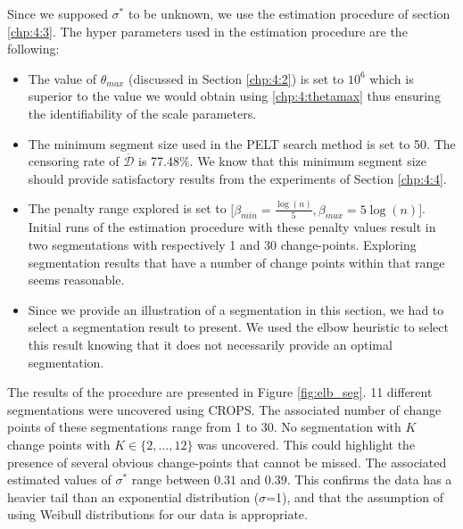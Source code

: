 Since we supposed $\sigma^*$ to be unknown, we use the estimation procedure of section \ref{chp:4:3}. The hyper parameters used in the estimation procedure are the following: 
\begin{itemize}
\item The value of $\theta_{max}$ (discussed in Section \ref{chp:4:2}) is set to $10^6$ which is superior to the value we would obtain using \eqref{chp:4:thetamax} thus ensuring the identifiability of the scale  parameters. 
\item The minimum segment size used in the PELT search method is set to 50. The censoring rate of $\overline{\mathcal{D}}$ is 77.48\%. We know that this minimum segment size should provide satisfactory results from the experiments of Section \ref{chp:4:4}.
\item The penalty range explored is set to $\bigg[\beta_{min} = \frac{\log(n)}{5},\beta_{max} = 5\log(n)\bigg]$. Initial runs of the estimation procedure with these penalty values result in two segmentations with respectively 1 and 30 change-points. Exploring segmentation results that have a number of change points within that range seems reasonable. 
\item Since we provide an illustration of a segmentation in this section, we had to select a segmentation result to present. We used the elbow heuristic to select this result knowing that it does not necessarily provide an optimal segmentation.  
\end{itemize}

The results of the procedure are presented in Figure \ref{fig:elb_seg}. 11 different segmentations were uncovered using CROPS. 
The associated number of change points of these segmentations range from 1 to 30. No segmentation with $K$ change points with $K\in\{2,\dots,12\}$ was uncovered. This could highlight the presence of several obvious change-points that cannot be missed. 
The associated estimated values of $\sigma^*$ range between $0.31$ and $0.39$. This confirms the data has a heavier tail than an exponential distribution ($\sigma$=1), and that the assumption of using Weibull distributions for our data is appropriate.  

